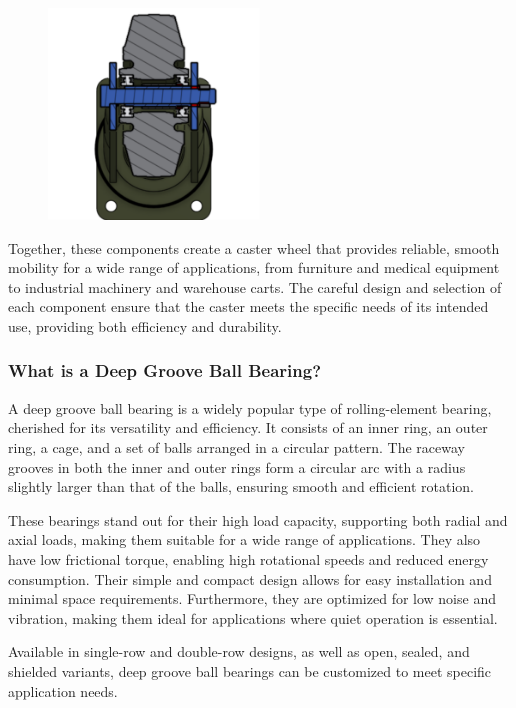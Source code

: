 \documentclass[../../main]{subfiles}
\begin{document}
\begin{figure}[h!]
  \centering
  \includegraphics[width=0.5\textwidth]{img/Picture3.png}
  \caption{}
  \end{figure}

  Together, these components create a caster wheel that provides reliable, smooth mobility for a wide range of applications, from furniture and medical equipment to industrial machinery and warehouse carts. The careful design and selection of each component ensure that the caster meets the specific needs of its intended use, providing both efficiency and durability.

  \subsubsection{What is a Deep Groove Ball Bearing?}
A deep groove ball bearing is a widely popular type of rolling-element bearing, cherished for its versatility and efficiency. It consists of an inner ring, an outer ring, a cage, and a set of balls arranged in a circular pattern. The raceway grooves in both the inner and outer rings form a circular arc with a radius slightly larger than that of the balls, ensuring smooth and efficient rotation. 

These bearings stand out for their high load capacity, supporting both radial and axial loads, making them suitable for a wide range of applications. They also have low frictional torque, enabling high rotational speeds and reduced energy consumption. Their simple and compact design allows for easy installation and minimal space requirements. Furthermore, they are optimized for low noise and vibration, making them ideal for applications where quiet operation is essential.

Available in single-row and double-row designs, as well as open, sealed, and shielded variants, deep groove ball bearings can be customized to meet specific application needs.
\end{document}
